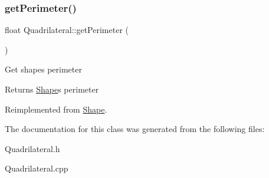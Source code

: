 \mbox{\label{class_quadrilateral_a6cbaf55455f983553b5fd8ff10c73a57}} 
\subsubsection{\texorpdfstring{get\+Perimeter()}{getPerimeter()}}
{\footnotesize\ttfamily float Quadrilateral\+::get\+Perimeter (\begin{DoxyParamCaption}{ }\end{DoxyParamCaption})\hspace{0.3cm}{\ttfamily [virtual]}}

Get shape\textquotesingle{}s perimeter \begin{DoxyReturn}{Returns}
\mbox{\hyperlink{class_shape}{Shape}}\textquotesingle{}s perimeter 
\end{DoxyReturn}


Reimplemented from \mbox{\hyperlink{class_shape_a3bf746915187cd97c88b77238093b950}{Shape}}.



The documentation for this class was generated from the following files\+:\begin{DoxyCompactItemize}
\item 
Quadrilateral.\+h\item 
Quadrilateral.\+cpp\end{DoxyCompactItemize}
